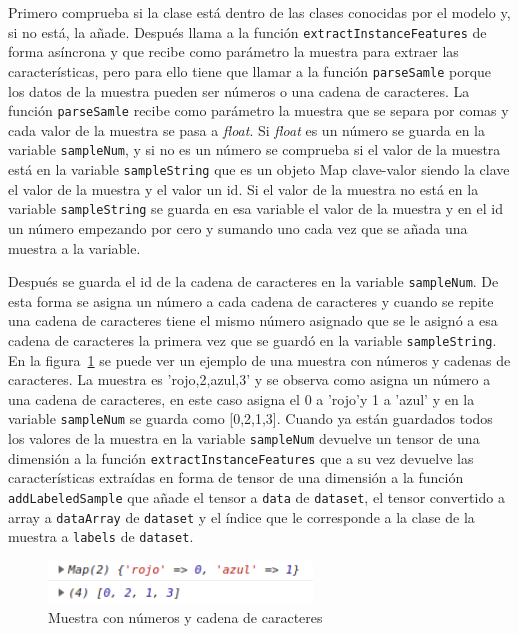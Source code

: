\documentclass[a4paper, 12pt]{book}
\begin{document}
Primero comprueba si la clase está dentro de las clases conocidas por el modelo y, si no está, la añade. 
Después llama a la función \texttt{extractInstanceFeatures} de forma asíncrona y que recibe como parámetro la muestra para extraer las características, pero para ello tiene que llamar a la función \texttt{parseSamle} porque los datos de la muestra pueden ser números o una cadena de caracteres. 
La función \texttt{parseSamle} recibe como parámetro la muestra que se separa por comas y cada valor de la muestra se pasa a \emph{float}. Si \emph{float} es un número se guarda en la variable \texttt{sampleNum}, y si no es un número se comprueba si el valor de la muestra está en la variable \texttt{sampleString} que es un objeto Map clave-valor siendo la clave el valor de la muestra y el valor un id. 
Si el valor de la muestra no está en la variable \texttt{sampleString} se guarda en esa variable el valor de la muestra y en el id un número empezando por cero y sumando uno cada vez que se añada una muestra a la variable. 

Después se guarda el id de la cadena de caracteres en la variable \texttt{sampleNum}. De esta forma se asigna un número a cada cadena de caracteres y cuando se repite una cadena de caracteres tiene el mismo número asignado que se le asignó a esa cadena de caracteres la primera vez que se guardó en la variable \texttt{sampleString}. 
En la figura~\ref{fig:ejemplo2} se puede ver un ejemplo de una muestra con números y cadenas de caracteres. La muestra es 'rojo,2,azul,3' y se observa como asigna un número a una cadena de caracteres, en este caso asigna el 0 a 'rojo'y 1 a 'azul' y en la variable \texttt{sampleNum} se guarda como [0,2,1,3]. 
Cuando ya están guardados todos los valores de la muestra en la variable \texttt{sampleNum} devuelve un tensor de una dimensión a la función \texttt{extractInstanceFeatures} que a su vez devuelve las características extraídas en forma de tensor de una dimensión a la función \texttt{addLabeledSample} que añade el tensor a \texttt{data} de \texttt{dataset}, el tensor convertido a array a \texttt{dataArray} de \texttt{dataset} y el índice que le corresponde a la clase de la muestra a \texttt{labels} de \texttt{dataset}.

\begin{figure}
	\centering
	\includegraphics[width=7cm, keepaspectratio]{img/ejemplo2.png}
	\caption{Muestra con números y cadena de caracteres} 	\label{fig:ejemplo2}
\end{figure}
\end{document}
